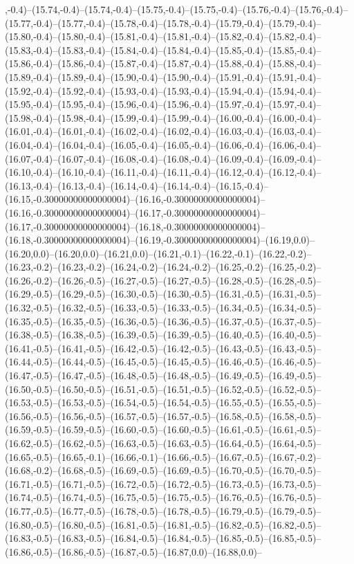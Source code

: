 ,-0.4)--(15.74,-0.4)--(15.74,-0.4)--(15.75,-0.4)--(15.75,-0.4)--(15.76,-0.4)--(15.76,-0.4)--(15.77,-0.4)--(15.77,-0.4)--(15.78,-0.4)--(15.78,-0.4)--(15.79,-0.4)--(15.79,-0.4)--(15.80,-0.4)--(15.80,-0.4)--(15.81,-0.4)--(15.81,-0.4)--(15.82,-0.4)--(15.82,-0.4)--(15.83,-0.4)--(15.83,-0.4)--(15.84,-0.4)--(15.84,-0.4)--(15.85,-0.4)--(15.85,-0.4)--(15.86,-0.4)--(15.86,-0.4)--(15.87,-0.4)--(15.87,-0.4)--(15.88,-0.4)--(15.88,-0.4)--(15.89,-0.4)--(15.89,-0.4)--(15.90,-0.4)--(15.90,-0.4)--(15.91,-0.4)--(15.91,-0.4)--(15.92,-0.4)--(15.92,-0.4)--(15.93,-0.4)--(15.93,-0.4)--(15.94,-0.4)--(15.94,-0.4)--(15.95,-0.4)--(15.95,-0.4)--(15.96,-0.4)--(15.96,-0.4)--(15.97,-0.4)--(15.97,-0.4)--(15.98,-0.4)--(15.98,-0.4)--(15.99,-0.4)--(15.99,-0.4)--(16.00,-0.4)--(16.00,-0.4)--(16.01,-0.4)--(16.01,-0.4)--(16.02,-0.4)--(16.02,-0.4)--(16.03,-0.4)--(16.03,-0.4)--(16.04,-0.4)--(16.04,-0.4)--(16.05,-0.4)--(16.05,-0.4)--(16.06,-0.4)--(16.06,-0.4)--(16.07,-0.4)--(16.07,-0.4)--(16.08,-0.4)--(16.08,-0.4)--(16.09,-0.4)--(16.09,-0.4)--(16.10,-0.4)--(16.10,-0.4)--(16.11,-0.4)--(16.11,-0.4)--(16.12,-0.4)--(16.12,-0.4)--(16.13,-0.4)--(16.13,-0.4)--(16.14,-0.4)--(16.14,-0.4)--(16.15,-0.4)--(16.15,-0.30000000000000004)--(16.16,-0.30000000000000004)--(16.16,-0.30000000000000004)--(16.17,-0.30000000000000004)--(16.17,-0.30000000000000004)--(16.18,-0.30000000000000004)--(16.18,-0.30000000000000004)--(16.19,-0.30000000000000004)--(16.19,0.0)--(16.20,0.0)--(16.20,0.0)--(16.21,0.0)--(16.21,-0.1)--(16.22,-0.1)--(16.22,-0.2)--(16.23,-0.2)--(16.23,-0.2)--(16.24,-0.2)--(16.24,-0.2)--(16.25,-0.2)--(16.25,-0.2)--(16.26,-0.2)--(16.26,-0.5)--(16.27,-0.5)--(16.27,-0.5)--(16.28,-0.5)--(16.28,-0.5)--(16.29,-0.5)--(16.29,-0.5)--(16.30,-0.5)--(16.30,-0.5)--(16.31,-0.5)--(16.31,-0.5)--(16.32,-0.5)--(16.32,-0.5)--(16.33,-0.5)--(16.33,-0.5)--(16.34,-0.5)--(16.34,-0.5)--(16.35,-0.5)--(16.35,-0.5)--(16.36,-0.5)--(16.36,-0.5)--(16.37,-0.5)--(16.37,-0.5)--(16.38,-0.5)--(16.38,-0.5)--(16.39,-0.5)--(16.39,-0.5)--(16.40,-0.5)--(16.40,-0.5)--(16.41,-0.5)--(16.41,-0.5)--(16.42,-0.5)--(16.42,-0.5)--(16.43,-0.5)--(16.43,-0.5)--(16.44,-0.5)--(16.44,-0.5)--(16.45,-0.5)--(16.45,-0.5)--(16.46,-0.5)--(16.46,-0.5)--(16.47,-0.5)--(16.47,-0.5)--(16.48,-0.5)--(16.48,-0.5)--(16.49,-0.5)--(16.49,-0.5)--(16.50,-0.5)--(16.50,-0.5)--(16.51,-0.5)--(16.51,-0.5)--(16.52,-0.5)--(16.52,-0.5)--(16.53,-0.5)--(16.53,-0.5)--(16.54,-0.5)--(16.54,-0.5)--(16.55,-0.5)--(16.55,-0.5)--(16.56,-0.5)--(16.56,-0.5)--(16.57,-0.5)--(16.57,-0.5)--(16.58,-0.5)--(16.58,-0.5)--(16.59,-0.5)--(16.59,-0.5)--(16.60,-0.5)--(16.60,-0.5)--(16.61,-0.5)--(16.61,-0.5)--(16.62,-0.5)--(16.62,-0.5)--(16.63,-0.5)--(16.63,-0.5)--(16.64,-0.5)--(16.64,-0.5)--(16.65,-0.5)--(16.65,-0.1)--(16.66,-0.1)--(16.66,-0.5)--(16.67,-0.5)--(16.67,-0.2)--(16.68,-0.2)--(16.68,-0.5)--(16.69,-0.5)--(16.69,-0.5)--(16.70,-0.5)--(16.70,-0.5)--(16.71,-0.5)--(16.71,-0.5)--(16.72,-0.5)--(16.72,-0.5)--(16.73,-0.5)--(16.73,-0.5)--(16.74,-0.5)--(16.74,-0.5)--(16.75,-0.5)--(16.75,-0.5)--(16.76,-0.5)--(16.76,-0.5)--(16.77,-0.5)--(16.77,-0.5)--(16.78,-0.5)--(16.78,-0.5)--(16.79,-0.5)--(16.79,-0.5)--(16.80,-0.5)--(16.80,-0.5)--(16.81,-0.5)--(16.81,-0.5)--(16.82,-0.5)--(16.82,-0.5)--(16.83,-0.5)--(16.83,-0.5)--(16.84,-0.5)--(16.84,-0.5)--(16.85,-0.5)--(16.85,-0.5)--(16.86,-0.5)--(16.86,-0.5)--(16.87,-0.5)--(16.87,0.0)--(16.88,0.0)--